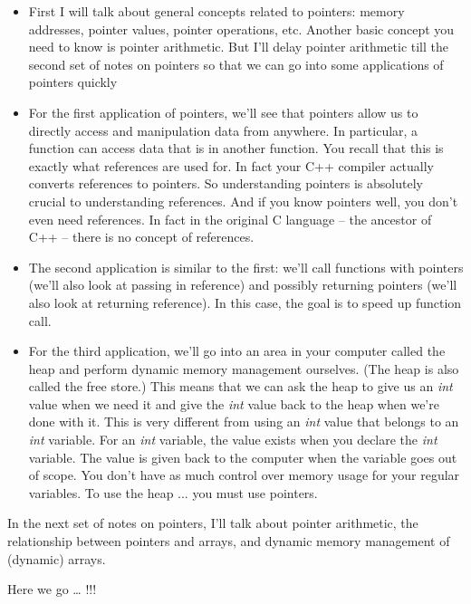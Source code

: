 \begin{itemize}

\item
  First I will talk about general concepts related to pointers: memory
  addresses, pointer values, pointer operations, etc. Another basic
  concept you need to know is pointer arithmetic. But I'll delay pointer
  arithmetic till the second set of notes on pointers so that we can go
  into some applications of pointers quickly
\item
  For the first application of pointers, we'll see that pointers allow
  us to directly access and manipulation data from anywhere. In
  particular, a function can access data that is in another function.
  You recall that this is exactly what references are used for. In fact
  your C++ compiler actually converts references to pointers. So
  understanding pointers is absolutely crucial to understanding
  references. And if you know pointers well, you don't even need
  references. In fact in the original C language -- the ancestor of C++
  -- there is no concept of references.
\item
  The second application is similar to the first: we'll call functions
  with pointers (we'll also look at passing in reference) and possibly
  returning pointers (we'll also look at returning reference). In this
  case, the goal is to speed up function call.
\item
  For the third application, we'll go into an area in your computer
  called the heap and perform dynamic memory management ourselves. (The
  heap is also called the free store.) This means that we can ask the
  heap to give us an \emph{int} value when we need it and give the
  \emph{int} value back to the heap when we're done with it. This is
  very different from using an \emph{int} value that belongs to an
  \emph{int} variable. For an \emph{int} variable, the value exists when
  you declare the \emph{int} variable. The value is given back to the
  computer when the variable goes out of scope. You don't have as much
  control over memory usage for your regular variables. To use the heap
  ... you must use pointers.
\end{itemize}

In the next set of notes on pointers, I'll talk about pointer arithmetic, the relationship between pointers and arrays, and dynamic memory management of (dynamic) arrays.

Here we go \ldots{} !!!

\newpage{}

